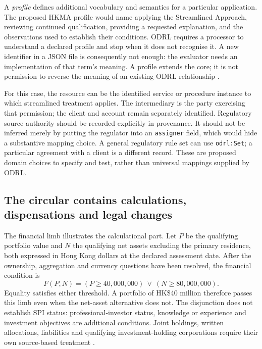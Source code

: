 A \emph{profile} defines additional vocabulary and semantics for a particular
application. The proposed HKMA profile would name applying the Streamlined
Approach, reviewing continued qualification, providing a requested explanation,
and the observations used to establish their conditions. ODRL requires a
processor to understand a declared profile and stop when it does not recognise
it. A new identifier in a JSON file is consequently not enough: the evaluator
needs an implementation of that term's meaning. A profile extends the core;
it is not permission to reverse the meaning of an existing ODRL relationship
\citep[sec.~3]{odrlmodel2018}.

For this case, the resource can be the identified service or procedure instance
to which streamlined treatment applies. The intermediary is the party exercising
that permission; the client and account remain separately identified. Regulatory
source authority should be recorded explicitly in provenance. It should not
be inferred merely by putting the regulator into an \texttt{assigner} field,
which would hide a substantive mapping choice. A general regulatory rule set
can use \texttt{odrl:Set}; a particular agreement with a client is a different
record. These are proposed domain choices to specify and test, rather than
universal mappings supplied by ODRL.

\subsection{The circular contains calculations, dispensations and legal changes}

The financial limb illustrates the calculational part. Let $P$ be the
qualifying portfolio value and $N$ the qualifying net assets excluding the
primary residence, both expressed in Hong Kong dollars at the declared
assessment date. After the ownership, aggregation and currency questions have
been resolved, the financial condition is
\begin{equation}
\label{eq:odrl-financial-limb}
 F(P,N)=(P\geq 40{,}000{,}000)\ \lor\ (N\geq 80{,}000{,}000).
\end{equation}
Equality satisfies either threshold. A portfolio of HK\$40 million therefore
passes this limb even when the net-asset alternative does not. The disjunction
does not establish SPI status: professional-investor status, knowledge or
experience and investment objectives are additional conditions. Joint holdings,
written allocations, liabilities and qualifying investment-holding corporations
require their own source-based treatment
\citep[paras.~1--5]{sfcspiannex1}.

